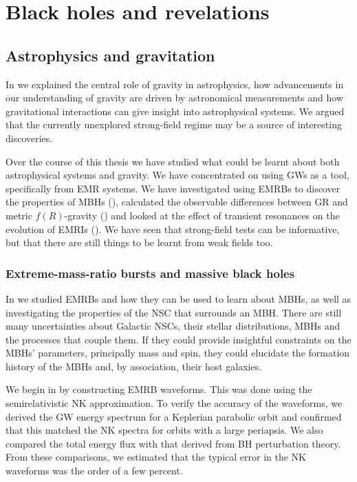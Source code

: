 \chapter{Black holes and revelations}\label{ch:All-good-things}

\section{Astrophysics and gravitation}

In  we explained the central role of gravity in astrophysics, how advancements in our understanding of gravity are driven by astronomical measurements and how gravitational interactions can give insight into astrophysical systems. We argued that the currently unexplored strong-field regime may be a source of interesting discoveries.

Over the course of this thesis we have studied what could be learnt about both astrophysical systems and gravity. We have concentrated on using GWs as a tool, specifically from EMR systems. We have investigated using EMRBs to discover the properties of MBHs (), calculated the observable differences between GR and metric $f(R)$-gravity () and looked at the effect of transient resonances on the evolution of EMRIs (). We have seen that strong-field tests can be informative, but that there are still things to be learnt from weak fields too.

\subsection{Extreme-mass-ratio bursts and massive black holes}\label{sec:Review-EMRBs}

In  we studied EMRBs and how they can be used to learn about MBHs, as well as investigating the properties of the NSC that surrounds an MBH. There are still many uncertainties about Galactic NSCs, their stellar distributions, MBHs and the processes that couple them. If they could provide insightful constraints on the MBHs' parameters, principally mass and spin, they could elucidate the formation history of the MBHs and, by association, their host galaxies.

We begin in  by constructing EMRB waveforms. This was done using the semirelativistic NK approximation. To verify the accuracy of the waveforms, we derived the GW energy spectrum for a Keplerian parabolic orbit and confirmed that this matched the NK spectra for orbits with a large periapsis. We also compared the total energy flux with that derived from BH perturbation theory. From these comparisons, we estimated that the typical error in the NK waveforms was the order of a few percent.

